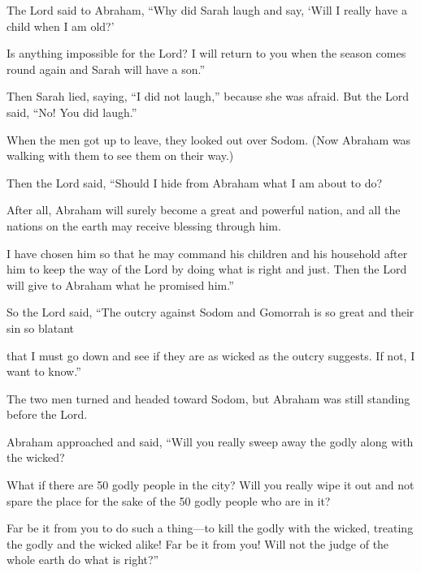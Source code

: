 \begin{scripture}
 The Lord said to Abraham, ``Why did Sarah laugh and say, `Will I really have a child when I am old?'
 Is anything impossible for the Lord? I will return to you when the season comes round again and Sarah will have a son.''
 Then Sarah lied, saying, ``I did not laugh,'' because she was afraid. But the Lord said, ``No! You did laugh.''
\everypar{}

 When the men got up to leave, they looked out over Sodom. (Now Abraham was walking with them to see them on their way.)
 Then the Lord said, ``Should I hide from Abraham what I am about to do?
 After all, Abraham will surely become a great and powerful nation, and all the nations on the earth may receive blessing through him.
 I have chosen him so that he may command his children and his household after him to keep the way of the Lord by doing what is right and just. Then the Lord will give to Abraham what he promised him.''
\everypar{}

 So the Lord said, ``The outcry against Sodom and Gomorrah is so great and their sin so blatant
 that I must go down and see if they are as wicked as the outcry suggests. If not, I want to know.''
\everypar{}

 The two men turned and headed toward Sodom, but Abraham was still standing before the Lord.
 Abraham approached and said, ``Will you really sweep away the godly along with the wicked?
 What if there are 50 godly people in the city? Will you really wipe it out and not spare the place for the sake of the 50 godly people who are in it?
 Far be it from you to do such a thing---to kill the godly with the wicked, treating the godly and the wicked alike! Far be it from you! Will not the judge of the whole earth do what is right?''
\everypar{}


\end{scripture}

